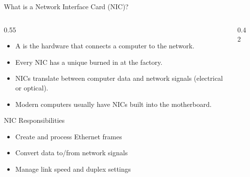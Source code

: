 \documentclass[aspectratio=169]{beamer}  %
\begin{document}
\begin{frame}{What is a Network Interface Card (NIC)?}
    \begin{columns}[T]
        \begin{column}{0.55\textwidth}
            \begin{itemize}
                \item A  is the hardware that connects a computer to the network.
                \item Every NIC has a unique  burned in at the factory.
                \item NICs translate between computer data and network signals (electrical or optical).
                \item Modern computers usually have NICs built into the motherboard.
            \end{itemize}
            
            \vspace{0.3em}
            \begin{block}{NIC Responsibilities}
                \begin{itemize}
                    \item Create and process Ethernet frames
                    \item Convert data to/from network signals
                    \item Manage link speed and duplex settings
                \end{itemize}
            \end{block}
        \end{column}
        \begin{column}{0.42\textwidth}
            \begin{center}
\end{center}
\end{column}
\end{columns}
\end{frame}
\end{document}

